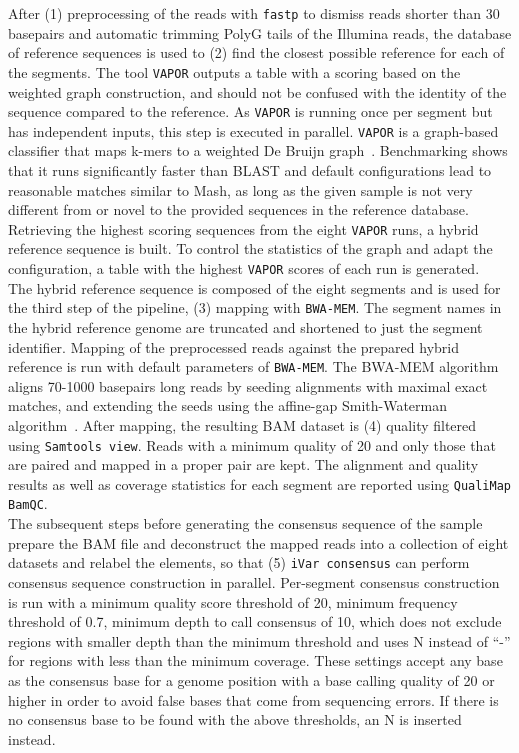 After (1) preprocessing of the reads with \texttt{fastp} to dismiss reads shorter than 30 basepairs and automatic trimming PolyG tails of the Illumina reads, the database of reference sequences is used to (2) find the closest possible reference for each of the segments. The tool \texttt{VAPOR} outputs a table with a scoring based on the weighted graph construction, and should not be confused with the identity of the sequence compared to the reference. As \texttt{VAPOR} is running once per segment but has independent inputs, this step is executed in parallel. \texttt{VAPOR} is a graph-based classifier that maps k-mers to a weighted De Bruijn graph~\cite{southgate2020influenza}. Benchmarking shows that it runs significantly faster than \ac{BLAST} and default configurations lead to reasonable matches similar to Mash, as long as the given sample is not very different from or novel to the provided sequences in the reference database. \\
Retrieving the highest scoring sequences from the eight \texttt{VAPOR} runs, a hybrid reference sequence is built. To control the statistics of the graph and adapt the configuration, a table with the highest \texttt{VAPOR} scores of each run is generated. \\
The hybrid reference sequence is composed of the eight segments and is used for the third step of the pipeline, (3) mapping with \texttt{BWA-MEM}. The segment names in the hybrid reference genome are truncated and shortened to just the segment identifier. Mapping of the preprocessed reads against the prepared hybrid reference is run with default parameters of \texttt{BWA-MEM}. The \ac{BWA-MEM} algorithm aligns 70-1000 basepairs long reads by seeding alignments with maximal exact matches, and extending the seeds using the affine-gap Smith-Waterman algorithm~\cite{li2013aligning}. After mapping, the resulting \ac{BAM} dataset is (4) quality filtered using \texttt{Samtools view}. Reads with a minimum quality of 20 and only those that are paired and mapped in a proper pair are kept. The alignment and quality results as well as coverage statistics for each segment are reported using \texttt{QualiMap BamQC}. \\
The subsequent steps before generating the consensus sequence of the sample prepare the \ac{BAM} file and deconstruct the mapped reads into a collection of eight datasets and relabel the elements, so that (5) \texttt{iVar consensus} can perform consensus sequence construction in parallel. Per-segment consensus construction is run with a minimum quality score threshold of 20, minimum frequency threshold of 0.7, minimum depth to call consensus of 10, which does not exclude regions with smaller depth than the minimum threshold and uses N instead of ``-'' for regions with less than the minimum coverage. These settings accept any base as the consensus base for a genome position with a base calling quality of 20 or higher in order to avoid false bases that come from sequencing errors. If there is no consensus base to be found with the above thresholds, an N is inserted instead. \\


